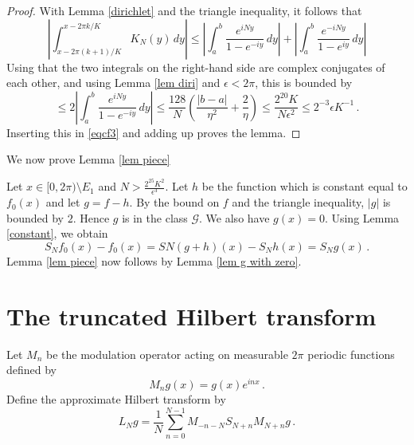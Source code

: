 \begin{proof}
With Lemma \ref{dirichlet} and the triangle inequality,
it follows that
\begin{equation}
    |\int_{x-2\pi (k+1)/K}^{x-2\pi k/K} K_N(y)\, dy|
    \le |\int_{a}^{b}
    \frac{e^{iNy}}{1-e^{-iy}}\, dy|+
    |\int_{a}^{b}
    \frac{e^{-iNy}}{1-e^{iy}}\, dy|
\end{equation}
Using that the two integrals on the right-hand side are complex conjugates of each other, and using Lemma \ref{lem diri} and $\epsilon <2\pi$, this is bounded by
\begin{equation}
    \le 2|\int_{a}^{b}
    \frac{e^{iNy}}{1-e^{-iy}}\, dy|
    \le \frac{128}N(\frac{|b-a|}{\eta^2}+\frac 2{\eta})
    \le \frac{2^{20}K}{N\epsilon^2 }\le 2^{-3}\epsilon K^{-1}\, .
\end{equation}
Inserting this in \eqref{eqcf3} and adding up proves
the lemma.



\end{proof}

We now prove  Lemma \ref{lem piece}

    Let $x\in [0,2\pi)\setminus E_1 $ and
    $N>\frac {2^25 K^2}{\epsilon ^3}$.
Let $h$ be the function which is constant equal to $f_0(x)$ and let $g=f-h$.
By the bound on $f$ and the triangle inequality,
$|g|$ is bounded by $2$. Hence $g$ is in the class $\mathcal{G}$. We also have $g(x)=0$.
Using Lemma \ref{constant}, we obtain
\begin{equation}
    S_Nf_0(x)- f_0(x)=SN(g+h)(x)- S_Nh(x)=S_Ng(x)\, .
\end{equation}
Lemma \ref{lem piece}
now follows by Lemma \ref{lem g with zero}.




\section{The truncated Hilbert transform}
\label{10hilbert}











Let $M_n$ be the modulation operator
acting on measurable $2\pi$ periodic functions
defined by
\begin{equation}
    M_ng(x)=g(x) e^{inx}\, .
\end{equation}
Define the approximate Hilbert transform by
\begin{equation}
    L_N g=\frac 1N\sum_{n=0}^{N-1}
        M_{-n-N} S_{N+n}M_{N+n}g\, .
\end{equation}



